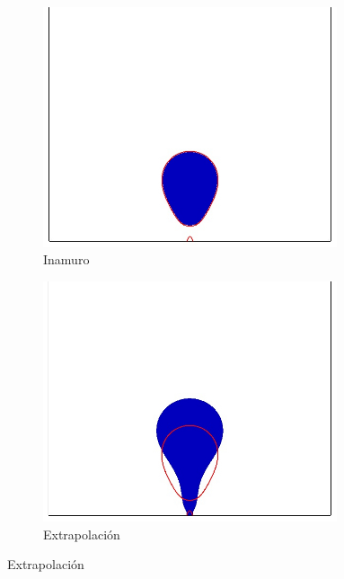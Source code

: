\begin{figure}[htb]
    \centering
    \begin{subfigure}[t]{0.45\textwidth}
        \centering
        \includegraphics[width=0.95\textwidth]{Imagenes/HetBoiling/Borde/density_inamuro_fd}        
        \caption{Inamuro}
	    \label{fig:bubble2d_inamuro}        
    \end{subfigure}
    \begin{subfigure}[t]{0.45\textwidth}
        \centering
        \includegraphics[width=0.95\textwidth]{Imagenes/HetBoiling/Borde/density_extrapolation_fd}
        \caption{Extrapolaci\'on}
    \end{subfigure}

\end{figure}
